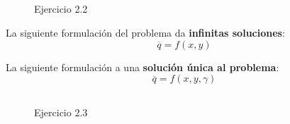 \documentclass[a4paper,12pt]{article}
\begin{document}
\subsection{}
\begin{figure}[H]
    \centering
    \begin{adjustbox}{scale = 0.55, max width=\columnwidth}
    \end{adjustbox}
    \caption{Ejercicio 2.2}
\end{figure}


La siguiente formulación del problema da \textbf{infinitas soluciones}:
\begin{equation*}
    \overline{q} = f(x, y)
\end{equation*}

La siguiente formulación a una \textbf{solución única al problema}:
\begin{equation*}
    \overline{q} = f(x, y, \gamma)
\end{equation*}

\subsection{}
\begin{figure}[H]
    \centering
    \begin{adjustbox}{scale = 0.55, max width=\columnwidth}
    \end{adjustbox}
    \caption{Ejercicio 2.3}
\end{figure}
\end{document}
